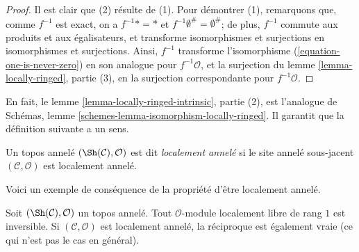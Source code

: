 \begin{proof}
Il est clair que (2) résulte de (1). Pour démontrer (1), remarquons que, comme
$f^{-1}$ est exact, on a $f^{-1}* = *$ et
$f^{-1}\emptyset^\# = \emptyset^\#$; de plus, $f^{-1}$ commute aux produits
et aux égalisateurs, et transforme isomorphismes et surjections en
isomorphismes et surjections. Ainsi, $f^{-1}$ transforme l'isomorphisme
(\ref{equation-one-is-never-zero}) en son analogue pour
$f^{-1}\mathcal{O}$, et la surjection du
lemme \ref{lemma-locally-ringed}, partie (3), en la surjection correspondante
pour $f^{-1}\mathcal{O}$.
\end{proof}

\noindent
En fait, le lemme \ref{lemma-locally-ringed-intrinsic}, partie (2), est
l'analogue de Schémas, lemme
\ref{schemes-lemma-isomorphism-locally-ringed}. Il garantit que la définition
suivante a un sens.

\begin{definition}
\label{definition-locally-ringed-topos}
Un topos annelé $(\Sh(\mathcal{C}), \mathcal{O})$ est dit
{\it localement annelé} si le site annelé sous-jacent
$(\mathcal{C}, \mathcal{O})$ est localement annelé.
\end{definition}

\noindent
Voici un exemple de conséquence de la propriété d'être localement annelé.

\begin{lemma}
\label{lemma-invertible-is-locally-free-rank-1}
Soit $(\Sh(\mathcal{C}), \mathcal{O})$ un topos annelé. Tout
$\mathcal{O}$-module localement libre de rang $1$ est inversible.
Si $(\mathcal{C}, \mathcal{O})$ est localement annelé, la réciproque est
également vraie (ce qui n'est pas le cas en général).
\end{lemma}

